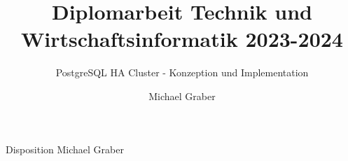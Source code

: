 \documentclass{grathesis}
\begin{document}
    \title{Diplomarbeit Technik und Wirtschaftsinformatik 2023-2024}
    \subtitle{PostgreSQL HA Cluster - Konzeption und Implementation} %
    \author{Michael Graber}

    \maketitle

    \begin{zusammenfassung}
        Disposition Michael Graber
    \end{zusammenfassung}


    \tableofcontents
    
    \startThesis %
    
    
    
    
\end{document}

